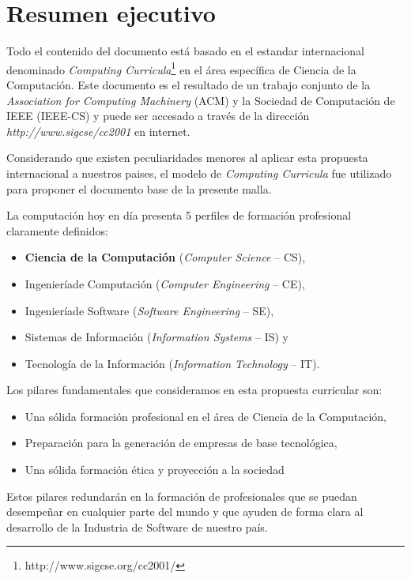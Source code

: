  \chapter*{Resumen ejecutivo}
\AbstractIntro

Todo el contenido del documento está basado en el estandar internacional denominado \textit{Computing Curricula}\footnote{http://www.sigcse.org/cc2001/} en el área específica de Ciencia de la Computación. Este documento es el resultado de un trabajo conjunto de la \textit{Association for Computing Machinery} (ACM) y la Sociedad de Computación de IEEE (IEEE-CS) y puede ser accesado a través de la dirección \textit{http://www.sigcse/cc2001} en internet.

Considerando que existen peculiaridades menores al aplicar esta propuesta internacional a nuestros paises, el modelo de \textit{Computing Curricula} fue utilizado para proponer el documento base de la presente malla. 

\noindent La computación hoy en día presenta 5 perfiles de formación profesional claramente definidos: 
\begin{itemize}
\item \textbf{Ciencia de la Computación} (\textit{Computer Science} -- CS),
\item Ingenieríade Computación (\textit{Computer Engineering} -- CE),
\item Ingenieríade Software (\textit{Software Engineering} -- SE),
\item Sistemas de Información (\textit{Information Systems} -- IS) y 
\item Tecnología de la Información (\textit{Information Technology} -- IT).
\end{itemize}

Los pilares fundamentales que consideramos en esta propuesta curricular son:
\begin{itemize}
\item Una sólida formación profesional en el área de Ciencia de la Computación,
\item Preparación para la generación de empresas de base tecnológica,
\item Una sólida formación ética y proyección a la sociedad
\end{itemize}

Estos pilares redundarán en la formación de profesionales que se puedan desempeñar en cualquier parte del mundo y que ayuden de forma clara al desarrollo de la Industria de Software de nuestro país. 

